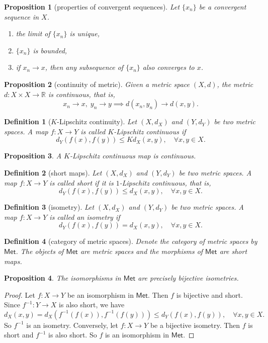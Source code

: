 \documentclass{report}
\newtheorem{definition}{Definition}[section]
\newtheorem{proposition}{Proposition}[section]
\theoremstyle{nonumberplain}
\newtheorem{proof}{Proof.}
\begin{document}
\begin{proposition}[properties of convergent sequences]
	Let $\{x_n\}$ be a convergent sequence in $X$.
	\begin{enumerate}
		\item the limit of $\{x_n\}$ is unique,
		\item $\{x_n\}$ is bounded,
		\item if $x_n\to x$, then any subsequence of $\{x_n\}$ also converges to $x$.
	\end{enumerate}	
\end{proposition}

\begin{proposition}[continuity of metric]
	Given a metric space $(X,d)$, the metric $d:X\times X\to \mathbb{R}$ is continuous, that is,
	\[
		x_n\to x,\; y_n\to y\implies d(x_n,y_n)\to d(x,y).
	\]
\end{proposition}
\begin{definition}[$K$-Lipschitz continuity]
	Let $(X,d_X)$ and $(Y,d_Y)$ be two metric spaces. A map $f:X\to Y$ is called \emph{$K$-Lipschitz continuous} if
	\[
		d_Y(f(x),f(y))\le Kd_X(x,y),\quad\forall x,y\in X.
	\]
\end{definition}
\begin{proposition}
	A $K$-Lipschitz continuous map is continuous.
\end{proposition}
\begin{definition}[short maps]
	Let $(X,d_X)$ and $(Y,d_Y)$ be two metric spaces. A map $f:X\to Y$ is called \emph{short} if it is $1$-Lipschitz continuous, that is,
	\[
		d_Y(f(x),f(y))\le d_X(x,y),\quad\forall x,y\in X.
	\]
\end{definition}
\begin{definition}[isometry]
	Let $(X,d_X)$ and $(Y,d_Y)$ be two metric spaces. A map $f:X\to Y$ is called an \emph{isometry} if
	\[
		d_Y(f(x),f(y))=d_X(x,y),\quad\forall x,y\in X.
	\]	
\end{definition}
\begin{definition}[category of metric spaces]
	Denote the category of metric spaces by $\mathsf{Met}$. The objects of $\mathsf{Met}$ are metric spaces and the morphisms of $\mathsf{Met}$ are short maps.
\end{definition}
\begin{proposition}
	The isomorphisms in $\mathsf{Met}$ are precisely bijective isometries.
\end{proposition}
\begin{proof}
	Let $f:X\to Y$ be an isomorphism in $\mathsf{Met}$. Then $f$ is bijective and short. Since $f^{-1}:Y\to X$ is also short, we have
	\[
		d_X(x,y)=d_X(f^{-1}(f(x)),f^{-1}(f(y)))\le d_Y(f(x),f(y)),\quad\forall x,y\in X.
	\]
	So $f^{-1}$ is an isometry. Conversely, let $f:X\to Y$ be a bijective isometry. Then $f$ is short and $f^{-1}$ is also short. So $f$ is an isomorphism in $\mathsf{Met}$.
\end{proof}
\end{document}
